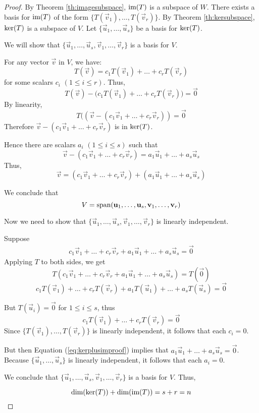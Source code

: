 \documentclass{ximera}
\begin{document}
\begin{proof}
By Theorem \ref{th:imagesubspace}, $\textnormal{im}(T)$ is a subspace of $W$.  There exists a basis for $\textnormal{im}(T)$ of the form $\{T(\vec{v}_1), \ldots,T(\vec{v}_r)\}$.  By Theorem \ref{th:kersubspace}, $\textnormal{ker}(T)$ is a subspace of $V$.  Let $\{\vec{u}_1,\ldots,\vec{u}_s\}$ be a basis for $\textnormal{ker}(T)$. 

We will show that $\{\vec{u}_1,\ldots ,\vec{u}_s, \vec{v}_1,\ldots ,\vec{v}_r\}$ is a basis for $V$.

For any vector $\vec{v}$ in $V$, we have:
$$T(\vec{v})=c_1T(\vec{v}_1)+\ldots +c_rT(\vec{v}_r)$$
for some scalars $c_i$ $(1\leq i\leq r)$.
Thus, 
$$T(\vec{v})-\big(c_1T(\vec{v}_1)+\ldots +c_rT(\vec{v}_r)\big)=\vec{0}$$
By linearity,
$$T((\vec{v}-(c_1\vec{v}_1+\ldots +c_r\vec{v}_r))=\vec{0}$$
Therefore $\vec{v}-(c_1\vec{v}_1+\ldots +c_r\vec{v}_r)$ is in $\textnormal{ker}(T)$.

Hence there are scalars $a_i$ $(1\leq i\leq s)$ such that
$$\vec{v}-(c_1\vec{v}_1+\ldots +c_r\vec{v}_r)=a_1\vec{u}_1+\ldots +a_s\vec{u}_s$$
Thus,
$$\vec{v}=(c_1\vec{v}_1+\ldots +c_r\vec{v}_r)+(a_1\vec{u}_1+\ldots +a_s\vec{u}_s)$$

We conclude that 
$$V=\textnormal{span}(\vec{u}_1,\ldots ,\vec{u}_s, \vec{v}_1,\ldots ,\vec{v}_r)$$

Now we need to show that $\{\vec{u}_1,\ldots ,\vec{u}_s, \vec{v}_1,\ldots ,\vec{v}_r\}$ is linearly independent.

Suppose 
\begin{align}\label{eq:kerplusimproof} c_1\vec{v}_1+\ldots +c_r\vec{v}_r+a_1\vec{u}_1+\ldots +a_s\vec{u}_s=\vec{0}\end{align}
Applying $T$ to both sides, we get
$$T(c_1\vec{v}_1+\ldots +c_r\vec{v}_r+a_1\vec{u}_1+\ldots +a_s\vec{u}_s)=T(\vec{0})$$
$$c_1T(\vec{v}_1)+\ldots +c_rT(\vec{v}_r)+a_1T(\vec{u}_1)+\ldots +a_sT(\vec{u}_s)=\vec{0}$$

But $T(\vec{u}_i)=\vec{0}$ for $1\leq i\leq s$, thus
$$c_1T(\vec{v}_1)+\ldots +c_rT(\vec{v}_r)=\vec{0}$$
Since $\{T(\vec{v}_1),\ldots ,T(\vec{v}_r)\}$ is linearly independent, it follows that each $c_i=0$.  

But then Equation (\ref{eq:kerplusimproof}) implies that $a_1\vec{u}_1+\ldots +a_s\vec{u}_s=\vec{0}$.  Because $\{\vec{u}_1, \ldots ,\vec{u}_s\}$ is linearly independent, it follows that each $a_i=0$.  

We conclude that $\{\vec{u}_1,\ldots ,\vec{u}_s,\vec{v}_1,\ldots ,\vec{v}_r\}$ is a basis for $V$.  Thus,

$$\textnormal{dim}(\textnormal{ker}(T))+\textnormal{dim}(\textnormal{im}(T))=s+r=n$$
\end{proof}
\end{document}
